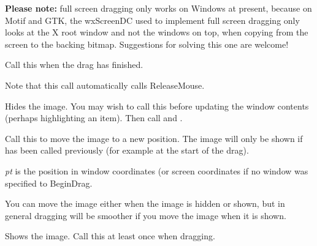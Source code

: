 





{\bf Please note:} full screen dragging only works on Windows at present,
because on Motif and GTK, the wxScreenDC used to implement full screen dragging only looks at the X root window and not
the windows on top, when copying from the screen to the backing bitmap.
Suggestions for solving this one are welcome!

\label{wxdragimageenddrag}


Call this when the drag has finished.

Note that this call automatically calls ReleaseMouse.

\label{wxdragimagehide}


Hides the image. You may wish to call this before updating the window
contents (perhaps highlighting an item). Then call  
and .

\label{wxdragimagemove}


Call this to move the image to a new position. The image will only be shown if 
 has been called previously (for example
at the start of the drag).

{\it pt} is the position in window coordinates (or screen coordinates if no
window was specified to BeginDrag.

You can move the image either when the image is hidden or shown, but in general dragging
will be smoother if you move the image when it is shown.

\label{wxdragimageshow}


Shows the image. Call this at least once when dragging.

